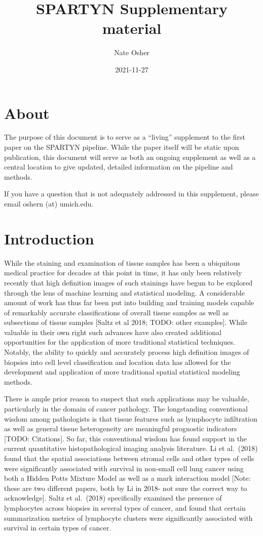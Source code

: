\documentclass[
]{book}
\title{SPARTYN Supplementary material}
\author{Nate Osher}
\date{2021-11-27}
\begin{document}
\maketitle

{
\setcounter{tocdepth}{1}
\tableofcontents
}
\hypertarget{about}{%
\chapter{About}\label{about}}

The purpose of this document is to serve as a ``living'' supplement to the first paper on the SPARTYN pipeline. While the paper itself will be static upon publication, this document will serve as both an ongoing supplement as well as a central location to give updated, detailed information on the pipeline and methods.

If you have a question that is not adequately addressed in this supplement, please email oshern (at) umich.edu.

\hypertarget{introduction}{%
\chapter{Introduction}\label{introduction}}

While the staining and examination of tissue samples has been a
ubiquitous medical practice for decades at this point in time, it
has only been relatively recently that high definition images of
such stainings have begun to be explored through the lens of
machine learning and statistical modeling. A considerable amount
of work has thus far been put into building and training models
capable of remarkably accurate classifications of overall tissue
samples as well as subsections of tissue samples {[}Saltz et al 2018;
TODO: other examples{]}. While valuable in their own right such
advances have also created additional opportunities for the
application of more traditional statistical techniques.
Notably, the ability to quickly and accurately process high definition
images of biopsies into cell level classification and location data
has allowed for the development and application of more traditional
spatial statistical modeling methods.

There is ample prior reason to suspect that such applications may
be valuable, particularly in the domain of cancer pathology. The
longstanding conventional wisdom among pathologists is that
tissue features such as lymphocyte infiltration as well as general
tissue heterogeneity are meaningful prognostic indicators {[}TODO:
Citations{]}. So far, this conventional wisdom has found support in
the current quantitative histopathological imaging analysis literature.
Li et al.~(2018) found that the spatial associations between stromal
cells and other types of cells were significantly associated with
survival in non-small cell lung cancer using both a Hidden Potts
Mixture Model as well as a mark interaction model {[}Note: these are
two different papers, both by Li in 2018- not sure the correct way
to acknowledge{]}. Saltz et al.~(2018) specifically examined the
presence of lymphocytes across biopsies in several types of cancer, and
found that certain summarization metrics of lymphocyte clusters were
significantly associated with survival in certain types of cancer.
\end{document}
